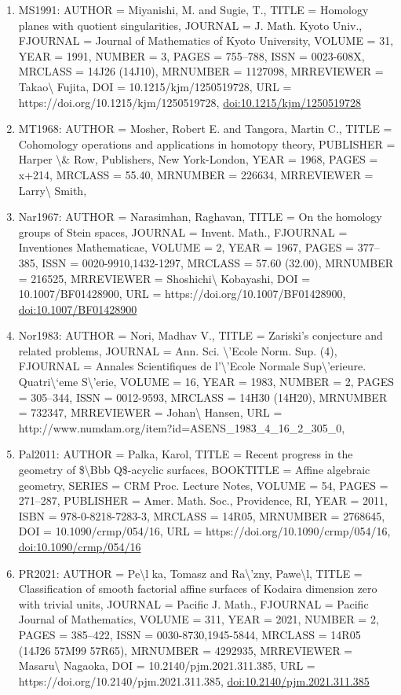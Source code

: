 \documentclass[11pt]{article}
\begin{document}
\begin{enumerate}[leftmargin=*]
  \item MS1991: AUTHOR = Miyanishi, M. and Sugie, T., TITLE = Homology planes with quotient singularities, JOURNAL = J. Math. Kyoto Univ., FJOURNAL = Journal of Mathematics of Kyoto University, VOLUME = 31, YEAR = 1991, NUMBER = 3, PAGES = 755--788, ISSN = 0023-608X, MRCLASS = 14J26 (14J10), MRNUMBER = 1127098, MRREVIEWER = Takao\textbackslash{} Fujita, DOI = 10.1215/kjm/1250519728, URL = https://doi.org/10.1215/kjm/1250519728, \href{https://doi.org/10.1215/kjm/1250519728}{doi:10.1215/kjm/1250519728}
  \item MT1968: AUTHOR = Mosher, Robert E. and Tangora, Martin C., TITLE = Cohomology operations and applications in homotopy theory, PUBLISHER = Harper \textbackslash{}\& Row, Publishers, New York-London, YEAR = 1968, PAGES = x+214, MRCLASS = 55.40, MRNUMBER = 226634, MRREVIEWER = Larry\textbackslash{} Smith,
  \item Nar1967: AUTHOR = Narasimhan, Raghavan, TITLE = On the homology groups of Stein spaces, JOURNAL = Invent. Math., FJOURNAL = Inventiones Mathematicae, VOLUME = 2, YEAR = 1967, PAGES = 377--385, ISSN = 0020-9910,1432-1297, MRCLASS = 57.60 (32.00), MRNUMBER = 216525, MRREVIEWER = Shoshichi\textbackslash{} Kobayashi, DOI = 10.1007/BF01428900, URL = https://doi.org/10.1007/BF01428900, \href{https://doi.org/10.1007/BF01428900}{doi:10.1007/BF01428900}
  \item Nor1983: AUTHOR = Nori, Madhav V., TITLE = Zariski's conjecture and related problems, JOURNAL = Ann. Sci. \textbackslash{}'Ecole Norm. Sup. (4), FJOURNAL = Annales Scientifiques de l'\textbackslash{}'Ecole Normale Sup\textbackslash{}'erieure. Quatri\textbackslash{}`eme S\textbackslash{}'erie, VOLUME = 16, YEAR = 1983, NUMBER = 2, PAGES = 305--344, ISSN = 0012-9593, MRCLASS = 14H30 (14H20), MRNUMBER = 732347, MRREVIEWER = Johan\textbackslash{} Hansen, URL = http://www.numdam.org/item?id=ASENS\_1983\_4\_16\_2\_305\_0,
  \item Pal2011: AUTHOR = Palka, Karol, TITLE = Recent progress in the geometry of \$\textbackslash{}Bbb Q\$-acyclic surfaces, BOOKTITLE = Affine algebraic geometry, SERIES = CRM Proc. Lecture Notes, VOLUME = 54, PAGES = 271--287, PUBLISHER = Amer. Math. Soc., Providence, RI, YEAR = 2011, ISBN = 978-0-8218-7283-3, MRCLASS = 14R05, MRNUMBER = 2768645, DOI = 10.1090/crmp/054/16, URL = https://doi.org/10.1090/crmp/054/16, \href{https://doi.org/10.1090/crmp/054/16}{doi:10.1090/crmp/054/16}
  \item PR2021: AUTHOR = Pe\textbackslash{}l ka, Tomasz and Ra\textbackslash{}'zny, Pawe\textbackslash{}l, TITLE = Classification of smooth factorial affine surfaces of Kodaira dimension zero with trivial units, JOURNAL = Pacific J. Math., FJOURNAL = Pacific Journal of Mathematics, VOLUME = 311, YEAR = 2021, NUMBER = 2, PAGES = 385--422, ISSN = 0030-8730,1945-5844, MRCLASS = 14R05 (14J26 57M99 57R65), MRNUMBER = 4292935, MRREVIEWER = Masaru\textbackslash{} Nagaoka, DOI = 10.2140/pjm.2021.311.385, URL = https://doi.org/10.2140/pjm.2021.311.385, \href{https://doi.org/10.2140/pjm.2021.311.385}{doi:10.2140/pjm.2021.311.385}

\end{enumerate}
\end{document}
